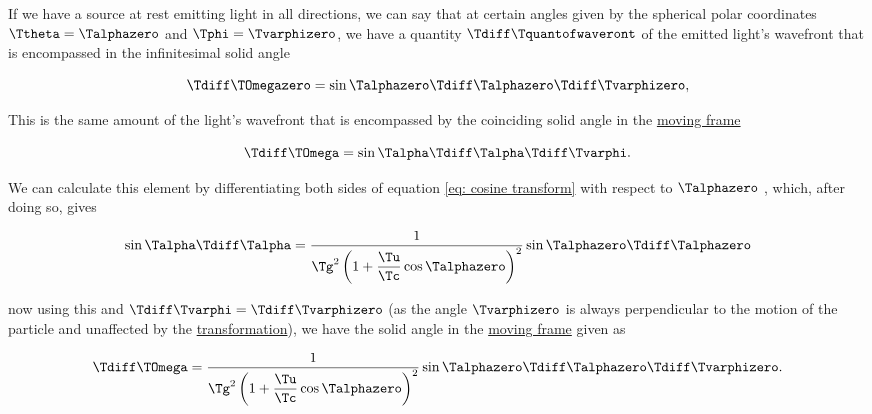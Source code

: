 \begin{derivation}

	If we have a source at rest emitting light in all directions, we can say that at certain angles given by the spherical polar coordinates $\Ttheta  = \Talphazero $ and $\Tphi = \Tvarphizero $, we have a quantity $\Tdiff \Tquantofwaveront $ of the emitted light's wavefront that is encompassed in the infinitesimal solid angle

	\begin{equation}
		\Tdiff \TOmegazero  = \sin{\Talphazero } \Tdiff \Talphazero  \Tdiff \Tvarphizero ,
	\end{equation}

	This is the same amount of the light's wavefront that is encompassed by the coinciding solid angle in the \hyperlink{def-Moving-Frame}{moving frame}

	\begin{equation}
		\Tdiff \TOmega  = \sin{\Talpha } \Tdiff \Talpha  \Tdiff \Tvarphi .
	\end{equation}

	We can calculate this element by differentiating both sides of equation	\eqref{eq: cosine transform} with respect to $\Talphazero $ \cite{hogg1997special}, which, after doing so, gives

	\begin{equation}
		\sin{\Talpha } \Tdiff \Talpha  = \dfrac{1}{ \Tg ^2 \left(1 + \dfrac{\Tu }{\Tc }\cos{\Talphazero }\right)^2} \sin{\Talphazero } \Tdiff \Talphazero
	\end{equation}

	now using this and ${\Tdiff \Tvarphi } = {\Tdiff \Tvarphizero }$ (as the angle ${\Tvarphizero }$ is always perpendicular to the motion of the particle and unaffected by the \hyperlink{def-transform}{transformation}), we have the solid angle in the \hyperlink{def-Moving-Frame}{moving frame} given as

	\begin{equation}
		\Tdiff \TOmega  = \dfrac{1}{ \Tg ^2 \left(1 + \dfrac{\Tu }{\Tc }\cos{\Talphazero }\right)^2} \sin{\Talphazero } \Tdiff \Talphazero  \Tdiff \Tvarphizero .
	\end{equation}



\end{derivation}

